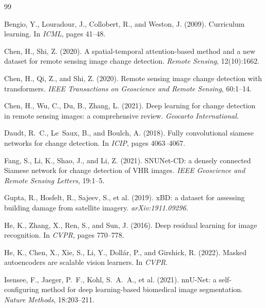 \documentclass[12pt,a4paper]{article}
\begin{document}

\begin{thebibliography}{99}

Bengio, Y., Louradour, J., Collobert, R., and Weston, J. (2009).
\newblock Curriculum learning.
\newblock In \textit{ICML}, pages 41--48.

Chen, H., Shi, Z. (2020).
\newblock A spatial-temporal attention-based method and a new dataset for remote sensing image change detection.
\newblock \textit{Remote Sensing}, 12(10):1662.

Chen, H., Qi, Z., and Shi, Z. (2020).
\newblock Remote sensing image change detection with transformers.
\newblock \textit{IEEE Transactions on Geoscience and Remote Sensing}, 60:1--14.

Chen, H., Wu, C., Du, B., Zhang, L. (2021).
\newblock Deep learning for change detection in remote sensing images: a comprehensive review.
\newblock \textit{Geocarto International}.

Daudt, R.~C., Le~Saux, B., and Boulch, A. (2018).
\newblock Fully convolutional siamese networks for change detection.
\newblock In \textit{ICIP}, pages 4063--4067.

Fang, S., Li, K., Shao, J., and Li, Z. (2021).
\newblock SNUNet-CD: a densely connected Siamese network for change detection of VHR images.
\newblock \textit{IEEE Geoscience and Remote Sensing Letters}, 19:1--5.

Gupta, R., Hosfelt, R., Sajeev, S., et al. (2019).
\newblock xBD: a dataset for assessing building damage from satellite imagery.
\newblock \textit{arXiv:1911.09296}.

He, K., Zhang, X., Ren, S., and Sun, J. (2016).
\newblock Deep residual learning for image recognition.
\newblock In \textit{CVPR}, pages 770--778.

He, K., Chen, X., Xie, S., Li, Y., Dollár, P., and Girshick, R. (2022).
\newblock Masked autoencoders are scalable vision learners.
\newblock In \textit{CVPR}.

Isensee, F., Jaeger, P.~F., Kohl, S.~A.~A., et al. (2021).
\newblock nnU-Net: a self-configuring method for deep learning-based biomedical image segmentation.
\newblock \textit{Nature Methods}, 18:203--211.


\end{thebibliography}
\end{document}
